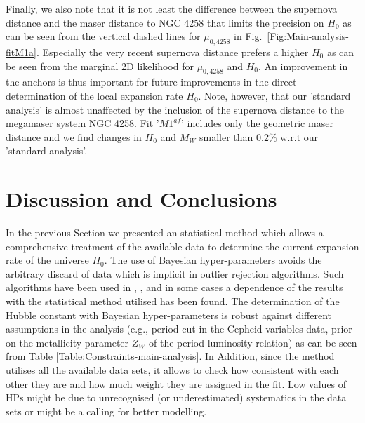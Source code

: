 Finally, we also note that it is not least the difference between the supernova distance \cite{Polshaw:2015ika} and
the maser distance \cite{Humphreys:2013eja} to NGC 4258 that limits the precision on $H_0$ as can be seen from the vertical dashed lines
for $\mu_{0,4258}$ in Fig.\ \ref{Fig:Main-analysis-fitM1a}. Especially the very recent supernova distance prefers a higher $H_0$ as can be seen
from the marginal 2D likelihood for $\mu_{0,4258}$ and $H_0$. An improvement in the anchors is thus important for future improvements in the
direct determination of the local expansion rate $H_0$. Note, however, that our 'standard analysis' is almost unaffected by the inclusion of the supernova distance \cite{Polshaw:2015ika} to the megamaser system NGC 4258. Fit '$M1^{af}$' includes only the geometric maser distance \cite{Humphreys:2013eja} and we find changes in $H_0$ and $M_W$ smaller than $0.2\%$ w.r.t our 'standard analysis'.

\section{Discussion and Conclusions}
\label{chapter-h0:Summary}


In the previous Section we presented an statistical method which allows a comprehensive treatment of the available data to determine the current expansion rate of the universe $H_0$. The use of Bayesian hyper-parameters avoids the arbitrary discard of data which is implicit in outlier rejection algorithms. Such algorithms have been used in  \cite{Riess:2009pu}, \cite{Riess:2011yx}, \cite{Efstathiou:2013via} and in some cases a dependence of the results with the statistical method utilised has been found. The determination of the Hubble constant with Bayesian hyper-parameters is robust against different assumptions in the analysis (e.g., period cut in the Cepheid variables data, prior on the metallicity parameter $Z_W$ of the period-luminosity relation) as can be seen from Table \ref{Table:Constraints-main-analysis}. In Addition, since the method utilises all the available data sets, it allows to check how consistent with each other they are and how much weight they are assigned in the fit. Low values of HPs might be due to unrecognised (or underestimated) systematics in the data sets or might be a calling for better modelling.


